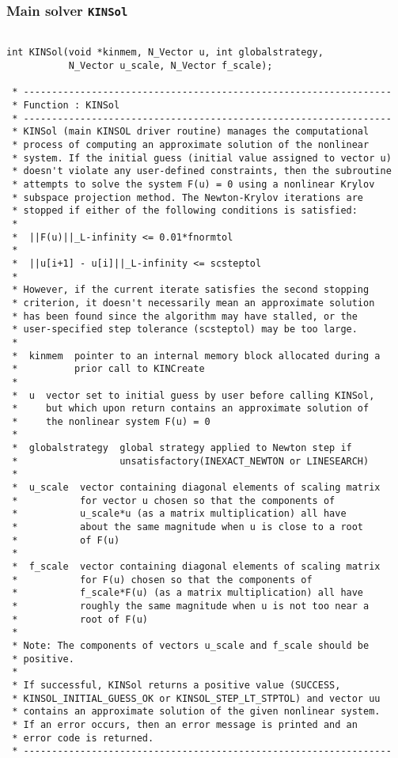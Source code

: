 \documentclass[11pt]{article}
\begin{document}
\subsubsection{Main solver {\tt KINSol}}

\small
\begin{verbatim}

int KINSol(void *kinmem, N_Vector u, int globalstrategy, 
           N_Vector u_scale, N_Vector f_scale);

 * -----------------------------------------------------------------
 * Function : KINSol
 * -----------------------------------------------------------------
 * KINSol (main KINSOL driver routine) manages the computational
 * process of computing an approximate solution of the nonlinear
 * system. If the initial guess (initial value assigned to vector u)
 * doesn't violate any user-defined constraints, then the subroutine
 * attempts to solve the system F(u) = 0 using a nonlinear Krylov
 * subspace projection method. The Newton-Krylov iterations are
 * stopped if either of the following conditions is satisfied:
 *
 *  ||F(u)||_L-infinity <= 0.01*fnormtol
 *
 *  ||u[i+1] - u[i]||_L-infinity <= scsteptol
 *
 * However, if the current iterate satisfies the second stopping
 * criterion, it doesn't necessarily mean an approximate solution
 * has been found since the algorithm may have stalled, or the
 * user-specified step tolerance (scsteptol) may be too large.
 *
 *  kinmem  pointer to an internal memory block allocated during a
 *          prior call to KINCreate
 *
 *  u  vector set to initial guess by user before calling KINSol,
 *     but which upon return contains an approximate solution of
 *     the nonlinear system F(u) = 0
 *
 *  globalstrategy  global strategy applied to Newton step if
 *                  unsatisfactory(INEXACT_NEWTON or LINESEARCH)
 *
 *  u_scale  vector containing diagonal elements of scaling matrix
 *           for vector u chosen so that the components of
 *           u_scale*u (as a matrix multiplication) all have
 *           about the same magnitude when u is close to a root
 *           of F(u)
 *
 *  f_scale  vector containing diagonal elements of scaling matrix
 *           for F(u) chosen so that the components of
 *           f_scale*F(u) (as a matrix multiplication) all have
 *           roughly the same magnitude when u is not too near a
 *           root of F(u)
 *
 * Note: The components of vectors u_scale and f_scale should be
 * positive.
 *
 * If successful, KINSol returns a positive value (SUCCESS,
 * KINSOL_INITIAL_GUESS_OK or KINSOL_STEP_LT_STPTOL) and vector uu
 * contains an approximate solution of the given nonlinear system.
 * If an error occurs, then an error message is printed and an
 * error code is returned.
 * -----------------------------------------------------------------


\end{verbatim}
\end{document}
